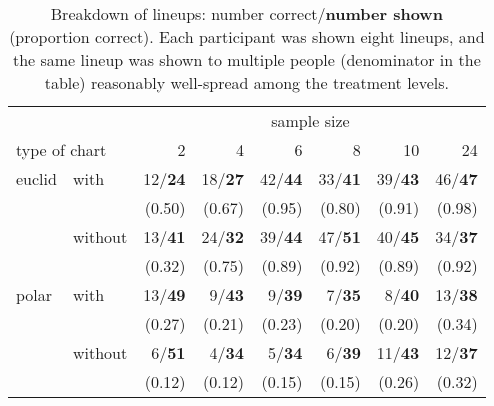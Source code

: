 \begin{table}[hbtp]
\centering
	\begin{tabular}{ll@{   }r@{   }r@{   }r@{   }r@{   }r@{   }r}
	& & \multicolumn{6}{c}{sample size}  \\
        \multicolumn{2}{l}{type of chart} & 2 & 4 & 6 & 8 & 10 & 24 \\ [1pt] \hline 
	euclid & with & 12/{\bf 24}& 18/{\bf 27} & 42/{\bf 44} & 33/{\bf 41} & 39/{\bf 43} & 46/{\bf 47}\\
	       &      &(0.50)& (0.67) & (0.95) & (0.80) & (0.91) & (0.98)\\[1pt]
	& without & 13/{\bf 41} &24/{\bf 32}& 39/{\bf 44} & 47/{\bf 51} & 40/{\bf 45} & 34/{\bf 37}\\
	&         & (0.32) &(0.75)& (0.89) & (0.92) & (0.89) & (0.92)\\[3pt] %
	polar & with & 13/{\bf 49}& 9/{\bf 43} & 9/{\bf 39} & 7/{\bf 35} & 8/{\bf 40} & 13/{\bf 38} \\
	      &      & (0.27)& (0.21) & (0.23) & (0.20) & (0.20) & (0.34) \\[1pt]
	& without & 6/{\bf 51}&   4/{\bf 34} &  5/{\bf 34} &  6/{\bf 39} & 11/{\bf 43} &  12/{\bf 37} \\
        &         & (0.12) & (0.12) &  (0.15) &  (0.15) & (0.26) &  (0.32)\\ 
	\end{tabular}
\caption{\label{tbl:treatment} Breakdown of lineups: number correct/\textbf{number shown} (proportion correct). Each participant was shown eight lineups, and the same lineup was shown to multiple people (denominator in the table) reasonably well-spread among the treatment levels. }
\end{table}


